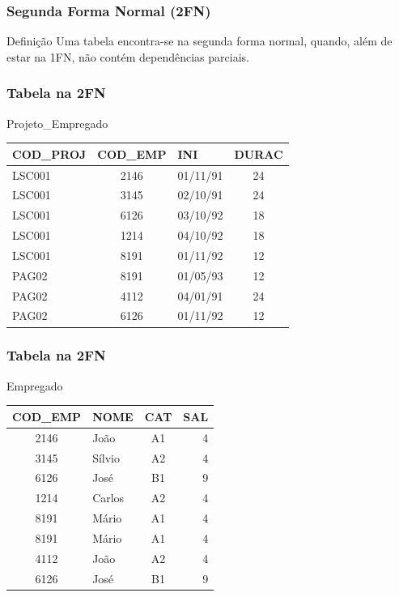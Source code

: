 \documentclass{beamer}
\begin{document}
\begin{frame}
\frametitle{Segunda Forma Normal (2FN)}

\begin{block}{Definição}
	Uma tabela encontra-se na segunda forma normal, quando, além de estar na 1FN, não contém dependências parciais.
\end{block}	
\end{frame}

\begin{frame}
\frametitle{Tabela na 2FN}

\begin{exampleblock}{Projeto\_Empregado}
	\centering
	\begin{tabular}{| l | c | l | c |}
		\hline
		COD\_PROJ & COD\_EMP &  INI & DURAC \\\hline
		LSC001 & 2146 & 01/11/91 & 24 \\\hline
		LSC001 & 3145 & 02/10/91 & 24 \\\hline
		LSC001 & 6126 & 03/10/92 & 18 \\\hline
		LSC001 & 1214 & 04/10/92 & 18 \\\hline
		LSC001  & 8191 &01/11/92 & 12 \\\hline
		PAG02 & 8191 & 01/05/93 & 12 \\\hline
		PAG02 & 4112 & 04/01/91 & 24 \\\hline
		PAG02 & 6126 &01/11/92 & 12 \\\hline
	\end{tabular}
\end{exampleblock}	
\end{frame}

\begin{frame}
\frametitle{Tabela na 2FN}

\begin{exampleblock}{Empregado}
\centering
\begin{tabular}{| c | l | c | r | }
	\hline
	COD\_EMP & NOME & CAT & SAL \\\hline
	2146 & João & A1 & 4 \\\hline
	3145 & Sílvio & A2 & 4 \\\hline
	6126 & José & B1 & 9 \\\hline
	1214 & Carlos & A2 & 4  \\\hline
	8191 & Mário & A1 & 4  \\\hline
	8191 & Mário & A1 & 4  \\\hline
	4112 & João & A2 & 4  \\\hline
	6126 & José & B1 & 9  \\\hline
\end{tabular}
\end{exampleblock}	
\end{frame}
\end{document}

